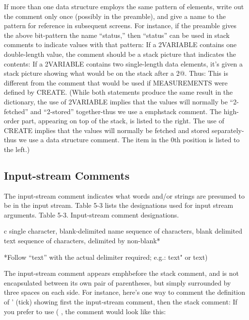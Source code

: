 If more than one data structure employs the same pattern of elements,
write out the comment only once (possibly in the preamble), and
give a name to the pattern for reference in subsequent screens.  For instance,
if the preamble gives the above bit-pattern the name ``status,''
then ``status'' can be used in stack comments to indicate values with that
pattern:
If a 2VARIABLE contains one double-length value, the comment should
be a stack picture that indicates the contents:
If a 2VARIABLE contains two single-length data elements, it's given a
stack picture showing what would be on the stack after a 2@.  Thus:
This is different from the comment that would be used if
MEASUREMENTS were defined by CREATE.
(While both statements produce the same result in the dictionary, the use
of 2VARIABLE implies that the values will normally be ``2-fetched'' and
``2-stored'' together-thus we use a emph{stack} comment.  The high-order part,
appearing on top of the stack, is listed to the right.  The use of CREATE
implies that the values will normally be fetched and stored
separately-thus we use a data structure comment.  The item in the 0th
position is listed to the left.)

\subsection{Input-stream Comments}

The input-stream comment indicates what words and/or strings are
presumed to be in the input stream.  Table 5-3 lists the designations used
for input stream arguments.
Table 5-3. Input-stream comment designations.

c       single character, blank-delimited
name    sequence of characters, blank delimited
text    sequence of characters, delimited by non-blank*

        *Follow ``text'' with the actual delimiter required; e.g.: text" or text)

The input-stream comment appears emph{before} the stack comment, and
is not encapsulated between its own pair of parentheses, but simply surrounded
by three spaces on each side.  For instance, here's one way to
comment the definition of ' (tick) showing first the input-stream comment,
then the stack comment:
If you prefer to use ( , the comment would look like this:

